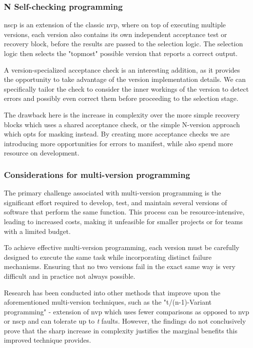 \subsubsection{N Self-checking programming}

\Acrfull{nscp} \cite{nscp} is an extension of the classic \acrshort{nvp}, where on top of executing multiple versions, each version also contains its own independent acceptance test or recovery block, before the results are passed to the selection logic. The selection logic then selects the "topmost" possible version that reports a correct output.

A version-specialized acceptance check is an interesting addition, as it provides the opportunity to take advantage of the version implementation details. We can specifically tailor the check to consider the inner workings of the version to detect errors and possibly even correct them before proceeding to the selection stage.

The drawback here is the increase in complexity over the more simple recovery blocks which uses a shared acceptance check, or the simple N-version approach which opts for masking instead. By creating more acceptance checks we are introducing more opportunities for errors to manifest, while also spend more resource on development.


\subsubsection{Considerations for multi-version programming}

The primary challenge associated with multi-version programming is the significant effort required to develop, test, and maintain several versions of software that perform the same function. This process can be resource-intensive, leading to increased costs, making it unfeasible for smaller projects or for teams with a limited budget.

To achieve effective multi-version programming, each version must be carefully designed to execute the same task while incorporating distinct failure mechanisms. Ensuring that no two versions fail in the exact same way is very difficult and in practice not always possible.

Research has been conducted into other methods that improve upon the aforementioned multi-version techniques, such as the "t/(n-1)-Variant programming" \cite{589928} - extension of \acrshort{nvp} which uses fewer comparisons as opposed to \acrshort{nvp} or \acrshort{nscp} and can tolerate up to \textit{t} faults. However, the findings do not conclusively prove that the sharp increase in complexity justifies the marginal benefits this improved technique provides.